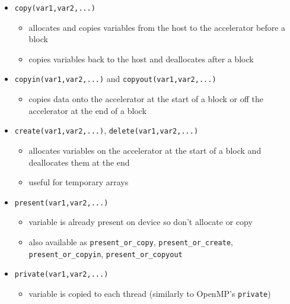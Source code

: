 \begin{itemize}
\itemsep1pt\parskip0pt
\item
  \texttt{copy(var1,var2,...)}

  \begin{itemize}
  \itemsep1pt\parskip0pt
  \item
    allocates and copies variables from the host to the accelerator
    before a block
  \item
    copies variables back to the host and deallocates after a block
  \end{itemize}
\item
  \texttt{copyin(var1,var2,...)} and \texttt{copyout(var1,var2,...)}

  \begin{itemize}
  \itemsep1pt\parskip0pt
  \item
    copies data onto the accelerator at the start of a block or off the
    accelerator at the end of a block
  \end{itemize}
\item
  \texttt{create(var1,var2,...)}, \texttt{delete(var1,var2,...)}

  \begin{itemize}
  \itemsep1pt\parskip0pt
  \item
    allocates variables on the accelerator at the start of a block and
    deallocates them at the end
  \item
    useful for temporary arrays
  \end{itemize}
\item
  \texttt{present(var1,var2,...)}

  \begin{itemize}
  \itemsep1pt\parskip0pt
  \item
    variable is already present on device so don't allocate or copy
  \item
    also available as \texttt{present\_or\_copy},
    \texttt{present\_or\_create}, \texttt{present\_or\_copyin},
    \texttt{present\_or\_copyout}
  \end{itemize}
\item
  \texttt{private(var1,var2,...)}

  \begin{itemize}
  \itemsep1pt\parskip0pt
  \item
    variable is copied to each thread (similarly to OpenMP's
    \texttt{private})
  \end{itemize}
\end{itemize}

